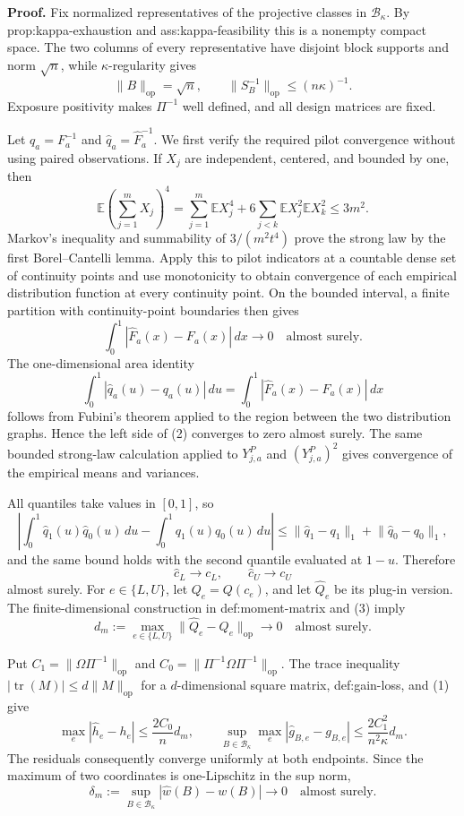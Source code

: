 \textbf{Proof.}
Fix normalized representatives of the projective classes in \(\mathcal B_\kappa\). By prop:kappa-exhaustion and ass:kappa-feasibility this is a nonempty compact space. The two columns of every representative have disjoint block supports and norm \(\sqrt n\), while \(\kappa\)-regularity gives
\[
\lVert B\rVert_{\mathrm{op}}=\sqrt n,
\qquad
\lVert S_B^{-1}\rVert_{\mathrm{op}}\le(n\kappa)^{-1}. \tag{1}
\]
Exposure positivity makes \(\Pi^{-1}\) well defined, and all design matrices are fixed.

Let \(q_a=F_a^{-1}\) and \(\widehat q_a=\widehat F_a^{-1}\). We first verify the required pilot convergence without using paired observations. If \(X_j\) are independent, centered, and bounded by one, then
\[
\mathbb E\left(\sum_{j=1}^mX_j\right)^4
=\sum_{j=1}^m\mathbb EX_j^4
+6\sum_{j<k}\mathbb EX_j^2\mathbb EX_k^2
\le3m^2.
\]
Markov's inequality and summability of \(3/(m^2t^4)\) prove the strong law by the first Borel--Cantelli lemma. Apply this to pilot indicators at a countable dense set of continuity points and use monotonicity to obtain convergence of each empirical distribution function at every continuity point. On the bounded interval, a finite partition with continuity-point boundaries then gives
\[
\int_0^1|\widehat F_a(x)-F_a(x)|\,dx\longrightarrow0
\quad\text{almost surely}.
\]
The one-dimensional area identity
\[
\int_0^1|\widehat q_a(u)-q_a(u)|\,du
=\int_0^1|\widehat F_a(x)-F_a(x)|\,dx \tag{2}
\]
follows from Fubini's theorem applied to the region between the two distribution graphs. Hence the left side of (2) converges to zero almost surely. The same bounded strong-law calculation applied to \(Y^P_{j,a}\) and \((Y^P_{j,a})^2\) gives convergence of the empirical means and variances.

All quantiles take values in \([0,1]\), so
\[
\left|\int_0^1\widehat q_1(u)\widehat q_0(u)\,du-
\int_0^1q_1(u)q_0(u)\,du\right|
\le\lVert\widehat q_1-q_1\rVert_1+\lVert\widehat q_0-q_0\rVert_1,
\]
and the same bound holds with the second quantile evaluated at \(1-u\). Therefore
\[
\widehat c_L\to c_L,
\qquad
\widehat c_U\to c_U \tag{3}
\]
almost surely. For \(e\in\{L,U\}\), let \(Q_e=Q(c_e)\), and let \(\widehat Q_e\) be its plug-in version. The finite-dimensional construction in def:moment-matrix and (3) imply
\[
d_m:=\max_{e\in\{L,U\}}\lVert\widehat Q_e-Q_e\rVert_{\mathrm{op}}
\longrightarrow0
\quad\text{almost surely}. \tag{4}
\]

Put \(C_1=\lVert\Omega\Pi^{-1}\rVert_{\mathrm{op}}\) and \(C_0=\lVert\Pi^{-1}\Omega\Pi^{-1}\rVert_{\mathrm{op}}\). The trace inequality \(|\operatorname{tr}(M)|\le d\lVert M\rVert_{\mathrm{op}}\) for a \(d\)-dimensional square matrix, def:gain-loss, and (1) give
\[
\max_e|\widehat h_e-h_e|\le \frac{2C_0}{n}d_m,
\qquad
\sup_{B\in\mathcal B_\kappa}\max_e|\widehat g_{B,e}-g_{B,e}|
\le\frac{2C_1^2}{n^2\kappa}d_m. \tag{5}
\]
The residuals consequently converge uniformly at both endpoints. Since the maximum of two coordinates is one-Lipschitz in the sup norm,
\[
\delta_m:=\sup_{B\in\mathcal B_\kappa}|\widehat w(B)-w(B)|
\longrightarrow0
\quad\text{almost surely}. \tag{6}
\]

